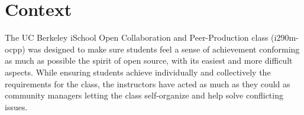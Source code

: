 \section{Context}
The  UC Berkeley iSchool Open Collaboration and Peer-Production class (i290m-ocpp) was designed to make sure students feel a sense of achievement conforming as much as possible the spirit of open source, with its easiest and more difficult aspects. While ensuring students achieve individually and collectively the requirements for the class, the instructors have acted as much as they could as community managers letting the class self-organize and help solve conflicting issues.


%
%

